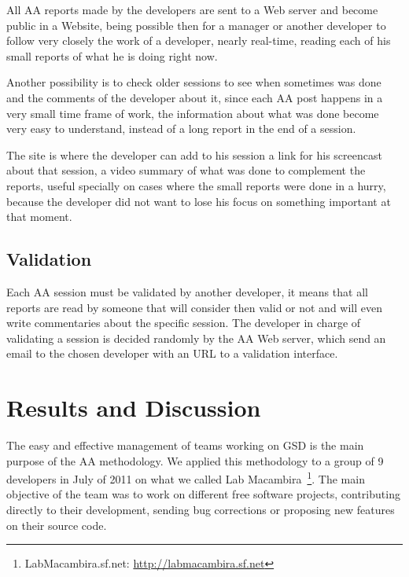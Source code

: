 \documentclass[letterpaper]{article}
\begin{document}
All AA reports made by the developers are sent to a Web server and
become public in a Website, being possible then for a manager or
another developer to follow very closely the work of a developer,
nearly real-time, reading each of his small reports of what he is
doing right now.

Another possibility is to check older sessions to see when sometimes
was done and the comments of the developer about it, since each AA
post happens in a very small time frame of work, the information about
what was done become very easy to understand, instead of a long
report in the end of a session.

The site is where the developer can add to his session a link for his
screencast about that session, a video summary of what was done to
complement the reports, useful specially on cases where the small
reports were done in a hurry, because the developer did not want to
lose his focus on something important at that moment.

\subsection{Validation}

Each AA session must be validated by another developer, it means that
all reports are read by someone that will consider then valid or not
and will even write commentaries about the specific session. The
developer in charge of validating a session is decided randomly by the
AA Web server, which send an email to the chosen developer with an
URL to a validation interface.


\section{Results and Discussion}
\label{results}

The easy and effective management of teams working on GSD is the main
purpose of the AA methodology. We applied this methodology to a group
of 9 developers in July of 2011 on what we called Lab
Macambira~\footnote{LabMacambira.sf.net:
  \url{http://labmacambira.sf.net}}. The main objective of the team
was to work on different free software projects, contributing directly
to their development, sending bug corrections or proposing new
features on their source code.
\end{document}
